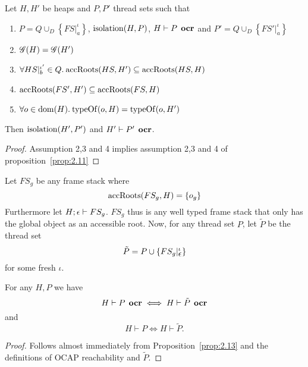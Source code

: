 \begin{corollary} \label{cor:2.11}
  Let $H, H'$ be heaps and $P, P'$ thread sets such that
  \begin{enumerate}
    \item $P = Q \cup_D \left\{ FS|_a^\iota \right\}$, $\mbox{$\mathrm{isolation}$}{(H, P)}$, $H
      \vdash P \:\: \mbox{\bf ocr}$ and $P' = Q \cup_D \left\{ FS'|_a^\iota \right\}$
    \item $\mathscr{G}{(H)} = \mathscr{G}{(H')}$
    \item $\forall HS|_b^{\iota'} \in Q. \: \mbox{$\mathrm{accRoots}$}{(HS, H')} \subseteq \mbox{$\mathrm{accRoots}$}{(HS, H)}$
    \item $\mbox{$\mathrm{accRoots}$}{(FS', H')} \subseteq \mbox{$\mathrm{accRoots}$}{(FS, H)}$
    \item $\forall o \in \mbox{$\mathrm{dom}$}{(H)}. \: \mbox{$\mathrm{typeOf}$}{(o, H)} = \mbox{$\mathrm{typeOf}$}{(o, H')}$
  \end{enumerate}
  Then $\mbox{$\mathrm{isolation}$}{(H', P')}$ and $H' \vdash P' \:\: \mbox{\bf ocr}$.
\end{corollary}

\begin{proof}
  Assumption 2,3 and 4 implies assumption 2,3 and 4 of
  proposition~\ref{prop:2.11}
\end{proof}

\begin{definition} \label{def:ptilde}
  Let $FS_g$ be any frame stack where 
  \begin{equation*}
    \mbox{$\mathrm{accRoots}$}(FS_g, H) = \left\{ o_g \right\}
  \end{equation*}
  Furthermore let $H; \mbox{$\epsilon$} \vdash FS_g$.
  $FS_g$ thus is any well typed frame stack that only has the global object as
  an accessible root.  Now, for any thread set $P$, let $\tilde{P}$ be the
  thread set
  \begin{equation*}
    \tilde{P} = P \cup \left\{ FS_g|_{\mbox{$\epsilon$}}^\iota \right\}
  \end{equation*}
  for some fresh $\iota$.
\end{definition}

\begin{proposition} \label{prop:ocrtilde_eq}
  For any $H, P$ we have
  \begin{equation*}
    H \vdash P \:\: \mbox{\bf ocr} \iff H \vdash \tilde{P} \:\: \mbox{\bf ocr}
  \end{equation*}
  and
  \begin{equation*}
    H \vdash P  \iff H \vdash \tilde{P}. 
  \end{equation*}
\end{proposition}
\begin{proof}
  Follows almost immediately from Proposition~\ref{prop:2.13} and the
  definitions of OCAP reachability and $\tilde{P}$.
\end{proof}

